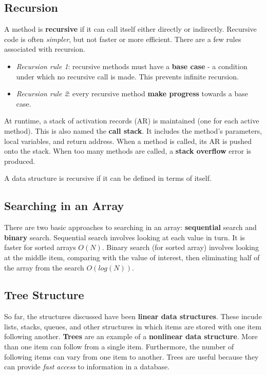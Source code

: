 \subsection{Recursion}

A method is \textbf{recursive} if it can call itself either directly or indirectly. Recursive code is often \textit{simpler}, but not faster or more efficient. There are a few rules associated with recursion. 

\begin{itemize}
	\item \textit{Recursion rule 1}: recursive methods must have a \textbf{base case} - a condition under which no recursive call is made. This prevents infinite recursion. 
	\item \textit{Recursion rule 2}: every recursive method \textbf{make progress} towards a base case. 
\end{itemize}

At runtime, a stack of activation records (AR) is maintained (one for each active method). This is also named the \textbf{call stack}. It includes the method's parameters, local variables, and return address. When a method is called, its AR is pushed onto the stack. When too many methods are called, a \textbf{stack overflow} error is produced. 

A data structure is recursive if it can be defined in terms of itself. 

\subsection{Searching in an Array}

There are two basic approaches to searching in an array: \textbf{sequential} search and \textbf{binary} search. Sequential search involves looking at each value in turn. It is faster for sorted arrays $O(N)$. Binary search (for sorted array) involves looking at the middle item, comparing with the value of interest, then eliminating half of the array from the search $O(log(N))$. 

\subsection{Tree Structure}

So far, the structures discussed have been \textbf{linear data structures}. These incude lists, stacks, queues, and other structures in which items are stored with one item following another. \textbf{Trees} are an example of a \textbf{nonlinear data structure}. More than one item can follow from a single item. Furthermore, the number of following items can vary from one item to another. Trees are useful because they can provide \textit{fast access} to information in a database. 

